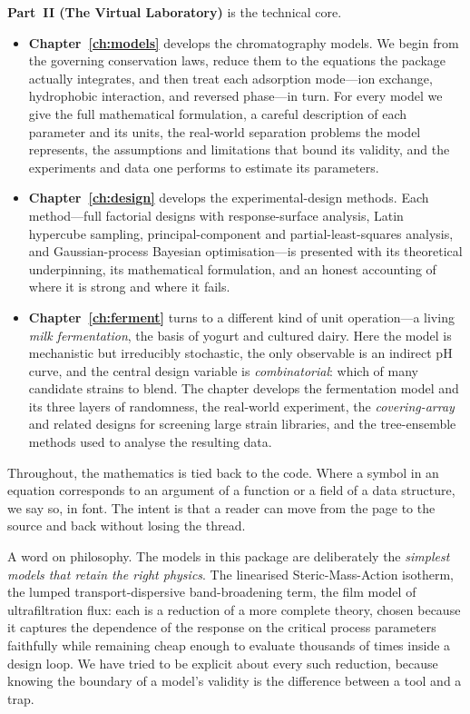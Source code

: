 \textbf{Part~II (The Virtual Laboratory)} is the technical core.

\begin{itemize}
  \item \textbf{Chapter~\ref{ch:models}} develops the chromatography models. We
  begin from the governing conservation laws, reduce them to the equations the
  package actually integrates, and then treat each adsorption mode---ion
  exchange, hydrophobic interaction, and reversed phase---in turn. For every
  model we give the full mathematical formulation, a careful description of each
  parameter and its units, the real-world separation problems the model
  represents, the assumptions and limitations that bound its validity, and the
  experiments and data one performs to estimate its parameters.

  \item \textbf{Chapter~\ref{ch:design}} develops the experimental-design
  methods. Each method---full factorial designs with response-surface analysis,
  Latin hypercube sampling, principal-component and partial-least-squares
  analysis, and Gaussian-process Bayesian optimisation---is presented with its
  theoretical underpinning, its mathematical formulation, and an honest
  accounting of where it is strong and where it fails.

  \item \textbf{Chapter~\ref{ch:ferment}} turns to a different kind of unit
  operation---a living \emph{milk fermentation}, the basis of yogurt and cultured
  dairy. Here the model is mechanistic but irreducibly stochastic, the only
  observable is an indirect pH curve, and the central design variable is
  \emph{combinatorial}: which of many candidate strains to blend. The chapter
  develops the fermentation model and its three layers of randomness, the
  real-world experiment, the \emph{covering-array} and related designs for
  screening large strain libraries, and the tree-ensemble methods used to analyse
  the resulting data.
\end{itemize}

Throughout, the mathematics is tied back to the code. Where a symbol in an
equation corresponds to an argument of a function or a field of a data
structure, we say so, in  font. The intent is that a reader can
move from the page to the source and back without losing the thread.

A word on philosophy. The models in this package are deliberately the
\emph{simplest models that retain the right physics}. The linearised
Steric-Mass-Action isotherm, the lumped transport-dispersive band-broadening
term, the film model of ultrafiltration flux: each is a reduction of a more
complete theory, chosen because it captures the dependence of the response on
the critical process parameters faithfully while remaining cheap enough to
evaluate thousands of times inside a design loop. We have tried to be explicit
about every such reduction, because knowing the boundary of a model's validity
is the difference between a tool and a trap.

